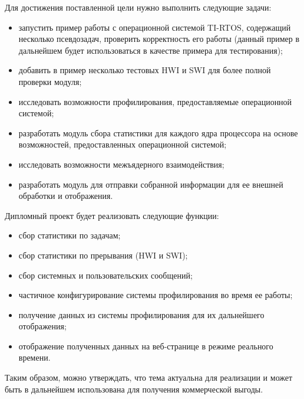 
Для достижения поставленной цели нужно выполнить следующие задачи:
\begin{itemize}
    \item запустить пример работы с операционной системой TI-RTOS, содержащий несколько псевдозадач, проверить корректность его работы (данный пример в дальнейшем будет использоваться в качестве примера для тестирования);
    \item добавить в пример несколько тестовых HWI и SWI для более полной проверки модуля;
    \item исследовать возможности профилирования, предоставляемые операционной системой;
    \item разработать модуль сбора статистики для каждого ядра процессора на основе возможностей, предоставленных операционной системой;
    \item исследовать возможности межъядерного взаимодействия;
    \item разработать модуль для отправки собранной информации для ее внешней обработки и отображения.
\end{itemize}

Дипломный проект будет реализовать следующие функции:
\begin{itemize}
    \item сбор статистики по задачам;
    \item сбор статистики по прерывания (HWI и SWI);
    \item сбор системных и пользовательских сообщений;
    \item частичное конфигурирование системы профилирования во время ее работы;
    \item получение данных из системы профилирования для их дальнейшего отображения;
    \item отображение полученных данных на веб-странице в режиме реального времени.
\end{itemize}

Таким образом, можно утверждать, что тема актуальна для реализации
и может быть в дальнейшем использована для получения коммерческой выгоды.

